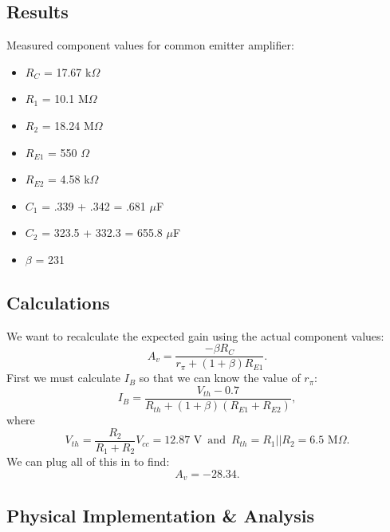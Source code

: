 \documentclass[12pt,letterpaper]{report}
\begin{document}
\subsection*{Results}

Measured component values for common emitter amplifier:
\begin{itemize}
\item $R_C$ = 17.67 k$\Omega$
\item $R_1$ = 10.1 M$\Omega$
\item $R_2$ = 18.24 M$\Omega$
\item $R_{E1}$ = 550 $\Omega$
\item $R_{E2}$ = 4.58 k$\Omega$
\item $C_1$ = .339 + .342 = .681 $\mu$F
\item $C_2$ = 323.5 + 332.3 = 655.8 $\mu$F
\item $\beta$ = 231
\end{itemize}



\subsection*{Calculations}

We want to recalculate the expected gain using the actual component values:
$$
A_v = \frac{-\beta R_C}{r_{\pi}+(1+\beta)R_{E1}}.
$$
First we must calculate $I_B$ so that we can know the value of $r_{\pi}$:
$$
I_B = \frac{V_{th}-0.7}{R_{th}+(1+\beta)(R_{E1}+R_{E2})},
$$
where
$$
V_{th} = \frac{R_2}{R_1+R_2}V_{cc} = 12.87 \text{ V}\, \text{ and } \, 
R_{th} = R_1||R_2 = 6.5 \text{ M}\Omega.
$$
We can plug all of this in to find:
$$
A_v = -28.34.
$$

\subsection*{Physical Implementation \& Analysis}
\end{document}
